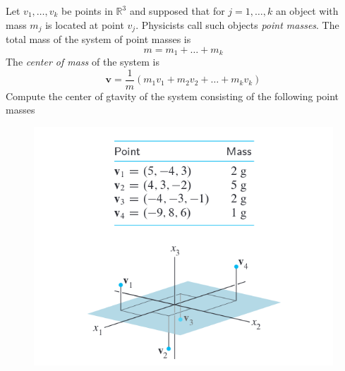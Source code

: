 \documentclass{../mathhomework}
\newcommand{\R}{\mathbb{R}}  %
\newcommand{\Vect}[1]{\pmb{#1}}
\begin{document}
\pagebreak
\begin{problem}[1.3\#29]
    Let $v_1,\ldots,v_k$ be points in $\R^3$ and supposed that for $j = 1,\ldots,k$ an object with mass $m_j$ is located at point $v_j$.
    Physicists call such objects \textit{point masses}. The total mass of the system of point masses is
    \begin{equation*}
        m = m_1 + \ldots + m_k
    \end{equation*}
    The \textit{center of mass} of the system is
    \begin{equation*}
        \Vect{v} = \frac{1}{m}(m_1v_1 + m_2v_2 + \ldots + m_kv_k)
    \end{equation*}
    Compute the center of gtavity of the system consisting of the following point masses
    \begin{figure}[H]
        \begin{center}
            \includegraphics[width=5in]{figures/1_3_29.png}
        \end{center}
    \end{figure}


\end{problem}
\end{document}
